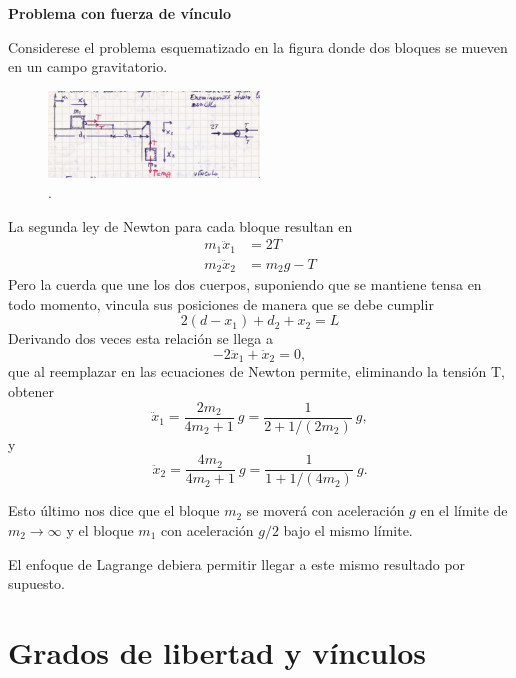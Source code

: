 \documentclass[10pt,oneside]{CBFT_book}
\begin{document}
\begin{ejemplo}{\bfseries Problema con fuerza de vínculo }

\label{problema_fuerza_vinculo}
Considerese el problema esquematizado en la figura donde dos bloques se mueven en un campo gravitatorio.
\begin{figure}[!ht]
	\centering
	\includegraphics[width=0.5\textwidth]{images/fig_mc_problema_bloques.jpg}
	\caption{.}
	\label{fig_mc_problema_bloques}
\end{figure}
La segunda ley de Newton para cada bloque resultan en
\begin{align*}
	m_1 \ddot{x}_1 &= 2T \\
	m_2 \ddot{x}_2 &= m_2 g - T
\end{align*}
Pero la cuerda que une los dos cuerpos, suponiendo que se mantiene tensa en todo momento, vincula sus posiciones de
manera que se debe cumplir
\[
	2(d-x_1) + d_2 + x_2 = L
\]
Derivando dos veces esta relación se llega a
\[
	- 2\ddot{x}_1 + \ddot{x}_2 = 0,
\]
que al reemplazar en las ecuaciones de Newton permite, eliminando la tensión T, obtener
\[
	\ddot{x}_1 = \frac{2 m_2}{4m_2 + 1} \: g = \frac{1}{2 + 1/(2m_2)} \: g ,
\]
y
\[
	\ddot{x}_2 = \frac{4 m_2}{4m_2 + 1} \: g = \frac{1}{1 + 1/(4m_2)} \: g.
\]

Esto último nos dice que el bloque $m_2$ se moverá con aceleración $g$ en el límite de $m_2 \to \infty$ y el bloque
$m_1$ con aceleración $g/2$ bajo el mismo límite.
\end{ejemplo}

El enfoque de Lagrange debiera permitir llegar a este mismo resultado por supuesto.


\section{Grados de libertad y vínculos}
\end{document}
